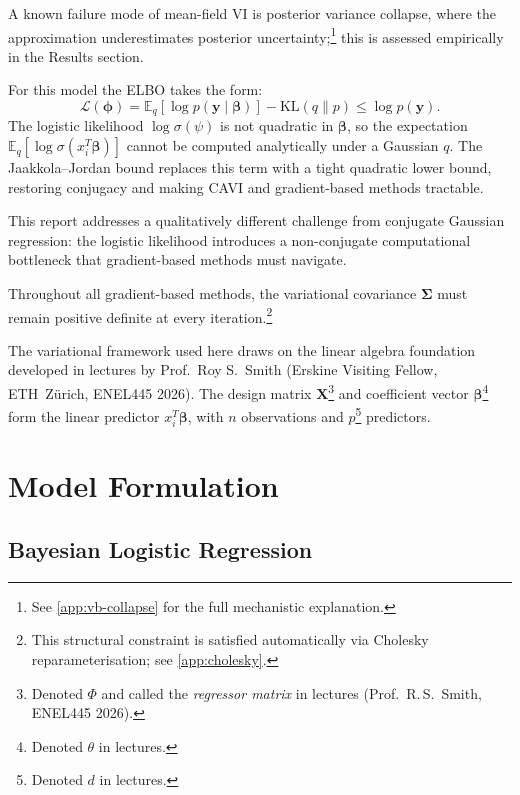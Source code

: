 \documentclass[11pt,a4paper]{article}
\newcommand{\E}{\mathbb{E}}
\begin{document}
A known failure mode of mean-field VI is posterior variance collapse, where the
approximation underestimates posterior uncertainty;\footnote{See \ref{app:vb-collapse} for the full mechanistic explanation.} this is assessed empirically in the Results section.

For this model the ELBO takes the form:
\begin{equation*}
  \mathcal{L}(\bm{\phi}) = \E_{q}[\log p(\bm{y}\mid\bm{\beta})] - \mathrm{KL}(q \| p)
  \leq \log p(\bm{y}).
\end{equation*}
The logistic likelihood $\log\sigma(\psi)$ is not quadratic in $\bm{\beta}$, so the
expectation $\E_q[\log\sigma(x_i^T\bm{\beta})]$ cannot be computed analytically under
a Gaussian $q$.
The Jaakkola--Jordan bound replaces this term with a tight quadratic lower bound,
restoring conjugacy and making CAVI and gradient-based methods tractable.

This report addresses a qualitatively different challenge from conjugate Gaussian
regression: the logistic likelihood introduces a non-conjugate computational bottleneck
that gradient-based methods must navigate.

Throughout all gradient-based methods, the variational covariance $\bm{\Sigma}$ must
remain positive definite at every iteration.\footnote{This structural constraint is satisfied automatically
via Cholesky reparameterisation; see \ref{app:cholesky}.}

The variational framework used here draws on the linear algebra foundation developed
in lectures by Prof.\ Roy S.\ Smith (Erskine Visiting Fellow, ETH~Z\"{u}rich, ENEL445 2026).
The design matrix $\bm{X}$\footnote{Denoted $\Phi$ and called the
\emph{regressor matrix} in lectures (Prof.\ R.\,S.\ Smith, ENEL445 2026).} and coefficient
vector $\bm{\beta}$\footnote{Denoted $\theta$ in lectures.} form the linear predictor
$x_i^T\bm{\beta}$, with $n$ observations and $p$\footnote{Denoted $d$ in lectures.}
predictors.

\section{Model Formulation}

\subsection{Bayesian Logistic Regression}
\end{document}
